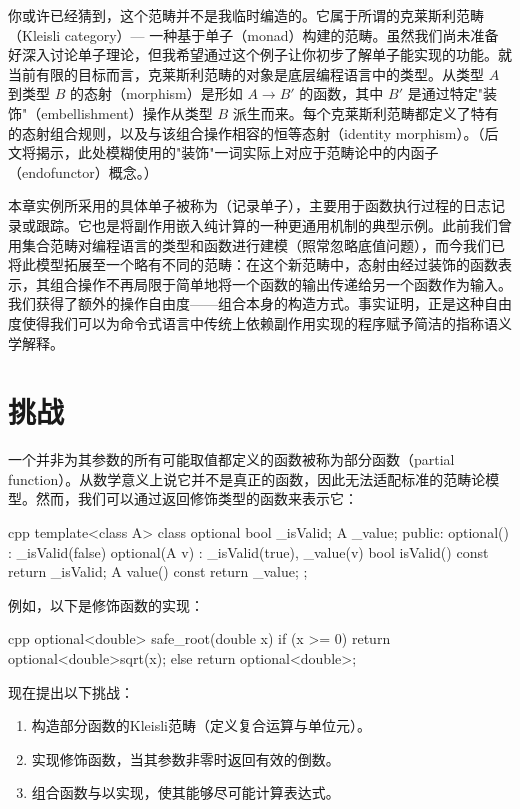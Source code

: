 你或许已经猜到，这个范畴并不是我临时编造的。它属于所谓的克莱斯利范畴（Kleisli category）--- 一种基于单子（monad）构建的范畴。虽然我们尚未准备好深入讨论单子理论，但我希望通过这个例子让你初步了解单子能实现的功能。就当前有限的目标而言，克莱斯利范畴的对象是底层编程语言中的类型。从类型 $A$ 到类型 $B$ 的态射（morphism）是形如 $A \to B'$ 的函数，其中 $B'$ 是通过特定"装饰"（embellishment）操作从类型 $B$ 派生而来。每个克莱斯利范畴都定义了特有的态射组合规则，以及与该组合操作相容的恒等态射（identity morphism）。（后文将揭示，此处模糊使用的"装饰"一词实际上对应于范畴论中的内函子（endofunctor）概念。）

本章实例所采用的具体单子被称为（记录单子），主要用于函数执行过程的日志记录或跟踪。它也是将副作用嵌入纯计算的一种更通用机制的典型示例。此前我们曾用集合范畴对编程语言的类型和函数进行建模（照常忽略底值问题），而今我们已将此模型拓展至一个略有不同的范畴：在这个新范畴中，态射由经过装饰的函数表示，其组合操作不再局限于简单地将一个函数的输出传递给另一个函数作为输入。我们获得了额外的操作自由度——组合本身的构造方式。事实证明，正是这种自由度使得我们可以为命令式语言中传统上依赖副作用实现的程序赋予简洁的指称语义学解释。

\section{挑战}

一个并非为其参数的所有可能取值都定义的函数被称为部分函数（partial function）。从数学意义上说它并不是真正的函数，因此无法适配标准的范畴论模型。然而，我们可以通过返回修饰类型的函数来表示它：

\begin{snip}{cpp}
template<class A> class optional {
    bool _isValid;
    A _value;
public: 
    optional()    : _isValid(false) {}
    optional(A v) : _isValid(true), _value(v) {}
    bool isValid() const { return _isValid; }
    A value() const { return _value; }
};
\end{snip}
例如，以下是修饰函数的实现：

\begin{snip}{cpp}
optional<double> safe_root(double x) {
    if (x >= 0) return optional<double>{sqrt(x)}; 
    else return optional<double>{};
}
\end{snip}
现在提出以下挑战：

\begin{enumerate}
  \tightlist
  \item
        构造部分函数的Kleisli范畴（定义复合运算与单位元）。
  \item
        实现修饰函数，当其参数非零时返回有效的倒数。
  \item
        组合函数与以实现，使其能够尽可能计算表达式。
\end{enumerate}